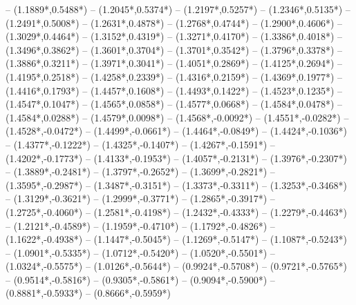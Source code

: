 {	-- ({1.1889*\dx},{0.5488*\dy})
	-- ({1.2045*\dx},{0.5374*\dy})
	-- ({1.2197*\dx},{0.5257*\dy})
	-- ({1.2346*\dx},{0.5135*\dy})
	-- ({1.2491*\dx},{0.5008*\dy})
	-- ({1.2631*\dx},{0.4878*\dy})
	-- ({1.2768*\dx},{0.4744*\dy})
	-- ({1.2900*\dx},{0.4606*\dy})
	-- ({1.3029*\dx},{0.4464*\dy})
	-- ({1.3152*\dx},{0.4319*\dy})
	-- ({1.3271*\dx},{0.4170*\dy})
	-- ({1.3386*\dx},{0.4018*\dy})
	-- ({1.3496*\dx},{0.3862*\dy})
	-- ({1.3601*\dx},{0.3704*\dy})
	-- ({1.3701*\dx},{0.3542*\dy})
	-- ({1.3796*\dx},{0.3378*\dy})
	-- ({1.3886*\dx},{0.3211*\dy})
	-- ({1.3971*\dx},{0.3041*\dy})
	-- ({1.4051*\dx},{0.2869*\dy})
	-- ({1.4125*\dx},{0.2694*\dy})
	-- ({1.4195*\dx},{0.2518*\dy})
	-- ({1.4258*\dx},{0.2339*\dy})
	-- ({1.4316*\dx},{0.2159*\dy})
	-- ({1.4369*\dx},{0.1977*\dy})
	-- ({1.4416*\dx},{0.1793*\dy})
	-- ({1.4457*\dx},{0.1608*\dy})
	-- ({1.4493*\dx},{0.1422*\dy})
	-- ({1.4523*\dx},{0.1235*\dy})
	-- ({1.4547*\dx},{0.1047*\dy})
	-- ({1.4565*\dx},{0.0858*\dy})
	-- ({1.4577*\dx},{0.0668*\dy})
	-- ({1.4584*\dx},{0.0478*\dy})
	-- ({1.4584*\dx},{0.0288*\dy})
	-- ({1.4579*\dx},{0.0098*\dy})
	-- ({1.4568*\dx},{-0.0092*\dy})
	-- ({1.4551*\dx},{-0.0282*\dy})
	-- ({1.4528*\dx},{-0.0472*\dy})
	-- ({1.4499*\dx},{-0.0661*\dy})
	-- ({1.4464*\dx},{-0.0849*\dy})
	-- ({1.4424*\dx},{-0.1036*\dy})
	-- ({1.4377*\dx},{-0.1222*\dy})
	-- ({1.4325*\dx},{-0.1407*\dy})
	-- ({1.4267*\dx},{-0.1591*\dy})
	-- ({1.4202*\dx},{-0.1773*\dy})
	-- ({1.4133*\dx},{-0.1953*\dy})
	-- ({1.4057*\dx},{-0.2131*\dy})
	-- ({1.3976*\dx},{-0.2307*\dy})
	-- ({1.3889*\dx},{-0.2481*\dy})
	-- ({1.3797*\dx},{-0.2652*\dy})
	-- ({1.3699*\dx},{-0.2821*\dy})
	-- ({1.3595*\dx},{-0.2987*\dy})
	-- ({1.3487*\dx},{-0.3151*\dy})
	-- ({1.3373*\dx},{-0.3311*\dy})
	-- ({1.3253*\dx},{-0.3468*\dy})
	-- ({1.3129*\dx},{-0.3621*\dy})
	-- ({1.2999*\dx},{-0.3771*\dy})
	-- ({1.2865*\dx},{-0.3917*\dy})
	-- ({1.2725*\dx},{-0.4060*\dy})
	-- ({1.2581*\dx},{-0.4198*\dy})
	-- ({1.2432*\dx},{-0.4333*\dy})
	-- ({1.2279*\dx},{-0.4463*\dy})
	-- ({1.2121*\dx},{-0.4589*\dy})
	-- ({1.1959*\dx},{-0.4710*\dy})
	-- ({1.1792*\dx},{-0.4826*\dy})
	-- ({1.1622*\dx},{-0.4938*\dy})
	-- ({1.1447*\dx},{-0.5045*\dy})
	-- ({1.1269*\dx},{-0.5147*\dy})
	-- ({1.1087*\dx},{-0.5243*\dy})
	-- ({1.0901*\dx},{-0.5335*\dy})
	-- ({1.0712*\dx},{-0.5420*\dy})
	-- ({1.0520*\dx},{-0.5501*\dy})
	-- ({1.0324*\dx},{-0.5575*\dy})
	-- ({1.0126*\dx},{-0.5644*\dy})
	-- ({0.9924*\dx},{-0.5708*\dy})
	-- ({0.9721*\dx},{-0.5765*\dy})
	-- ({0.9514*\dx},{-0.5816*\dy})
	-- ({0.9305*\dx},{-0.5861*\dy})
	-- ({0.9094*\dx},{-0.5900*\dy})
	-- ({0.8881*\dx},{-0.5933*\dy})
	-- ({0.8666*\dx},{-0.5959*\dy})
}
